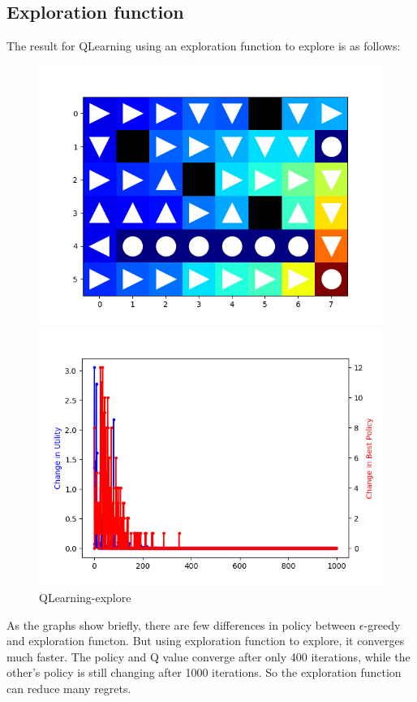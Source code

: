 \documentclass[aps,letterpaper,10pt]{revtex4}
\begin{document}
\subsection{Exploration function}
\par
The result for QLearning using an exploration function 
to explore is as follows:
\begin{figure}[htbp] 
    \centering 
    \begin{minipage}[t]{0.5\linewidth}
    \centering 
    \includegraphics[scale=0.5]{ql_explore.png} 
    \end{minipage}%
    \begin{minipage}[t]{0.5\linewidth} 
    \centering 
    \includegraphics[scale=0.5]{ql_explore_change.png} 
    \end{minipage}%
    \centering 
    \caption{QLearning-explore} 
\end{figure}
\par
As the graphs show briefly, there are few differences in policy 
between $\epsilon$-greedy and exploration functon. But using exploration 
function to explore, it converges much faster. The policy and Q value 
converge after only 400 iterations, while the other's policy is still 
changing after 1000 iterations. So the exploration function can reduce 
many regrets.
\newpage 
\end{document}
